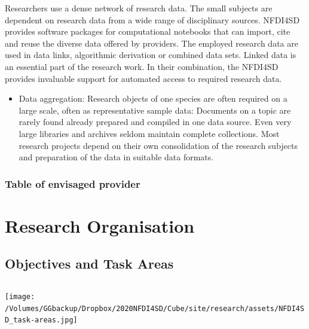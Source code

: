 \documentclass[
  english,
  paper=a4,
  oneside,captions=tableheading
]{scrbook}
\providecommand{\tightlist}{%
  \setlength{\itemsep}{0pt}\setlength{\parskip}{0pt}}
\begin{document}
Researchers use a dense network of research data. The small subjects are
dependent on research data from a wide range of disciplinary sources.
NFDI4SD provides software packages for computational notebooks that can
import, cite and reuse the diverse data offered by providers. The
employed research data are used in data links, algorithmic derivation or
combined data sets. Linked data is an essential part of the research
work. In their combination, the NFDI4SD provides invaluable support for
automated access to required research data.

\begin{itemize}
\tightlist
\item
  Data aggregation: Research objects of one species are often required
  on a large scale, often as representative sample data: Documents on a
  topic are rarely found already prepared and compiled in one data
  source. Even very large libraries and archives seldom maintain
  complete collections. Most research projects depend on their own
  consolidation of the research subjects and preparation of the data in
  suitable data formats.
\end{itemize}

\hypertarget{table-of-envisaged-provider}{%
\subsection{Table of envisaged
provider}\label{table-of-envisaged-provider}}

\hypertarget{research-organisation}{%
\chapter{Research Organisation}\label{research-organisation}}

\hypertarget{objectives-and-task-areas}{%
\section{Objectives and Task Areas}\label{objectives-and-task-areas}}

\hypertarget{section}{%
\section{}\label{section}}

\texttt{[image: /Volumes/GGbackup/Dropbox/2020NFDI4SD/Cube/site/research/assets/NFDI4SD\_task-areas.jpg]}
\end{document}
